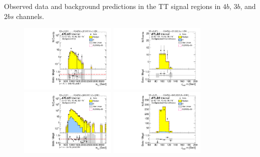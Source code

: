 \begin{table}[htb!]
\begin{center}
\caption{Observed data and background predictions in the TT signal regions in $4b$, $3b$, and $2bs$ channels.}

\label{tab:DataPred_ttSR}
\end{center}
\end{table}

\begin{figure}[htb!]
\begin{center}
\includegraphics[width=0.41\textwidth,angle=-90]{figures/boosted/ZZ/Moriond_ZZ_FourTag_Signal_mHH_l_1.pdf}
\includegraphics[width=0.41\textwidth,angle=-90]{figures/boosted/ZZ/Moriond_ZZ_FourTag_Signal_leadHCand_Mass_s.pdf}\\
\includegraphics[width=0.41\textwidth,angle=-90]{figures/boosted/ZZ/Moriond_ZZ_ThreeTag_Signal_mHH_l_1.pdf}
\includegraphics[width=0.41\textwidth,angle=-90]{figures/boosted/ZZ/Moriond_ZZ_ThreeTag_Signal_leadHCand_Mass_s.pdf}\\

\end{center}
\end{figure}
